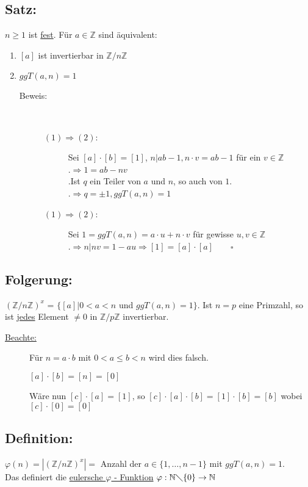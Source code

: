\subsection{Satz:}
$n \geq 1$ ist \underline{fest}. Für $a \in \mathbb{Z}$ sind äquivalent:
\begin{enumerate}
	\item $[a]$ ist invertierbar in $\mathbb{Z}/n\mathbb{Z}$
	\item $ggT(a,n) =1$
	\begin{description}
		\item[Beweis:] \qquad\\
		\begin{description}
			\item[$(1) \Rightarrow (2)$:] Sei $[a] \cdot [b] = [1]$, \qquad $n|ab - 1, n\cdot v = ab - 1$ für ein $v \in 
								\mathbb{Z}$\\
								.\quad $\Rightarrow 1 = ab - nv$\\
								.\quad Ist $q$ ein Teiler von $a$ und $n$, so auch von $1$. \\
								.\quad $\Rightarrow q = \pm 1, ggT(a,n) = 1$
			\item[$(1) \Rightarrow (2)$:] Sei $1 = ggT(a,n) = a \cdot u + n \cdot v$ für gewisse $u,v \in 
								\mathbb{Z}$\\
								.\quad $\Rightarrow n|nv = 1-au \Rightarrow [1] = [a]\cdot[a] \qquad 
									\square$
		\end{description}
	\end{description}
\end{enumerate}
%
%
%
\subsection{Folgerung:}
$(\mathbb{Z}/n\mathbb{Z})^{x}$ = $\{[a] | 0 < a < n$ und $ggT(a,n) = 1\}$. Ist $n=p$ eine Primzahl, so ist \underline{jedes} Element $\neq 0$ in $\mathbb{Z}/p\mathbb{Z}$ invertierbar.
\begin{description}
	\item[\underline{Beachte:}] \qquad
	\item[] Für $n=a\cdot b$ mit $0 < a \leq b < n$ wird dies falsch.
	\item[] $[a] \cdot [b] = [n] = [0]$
	\item[] Wäre nun $[c] \cdot [a] = [1]$, so $ [c] \cdot [a] \cdot [b] = [1] \cdot [b] = [b]$ wobei $[c] \cdot [0] = [0]$
\end{description}
%
%
%
\subsection{Definition:} 
$\varphi(n) = |(\mathbb{Z}/n\mathbb{Z})^{x}| = $ Anzahl der $ a \in \{ 1, \dotsc, n-1\}$ mit $ggT(a,n) = 1$.\\
Das definiert die \underline{eulersche $\varphi$ - Funktion} $\varphi : \mathbb{N}\diagdown\{0\} \rightarrow \mathbb{N}$
%
%
%
